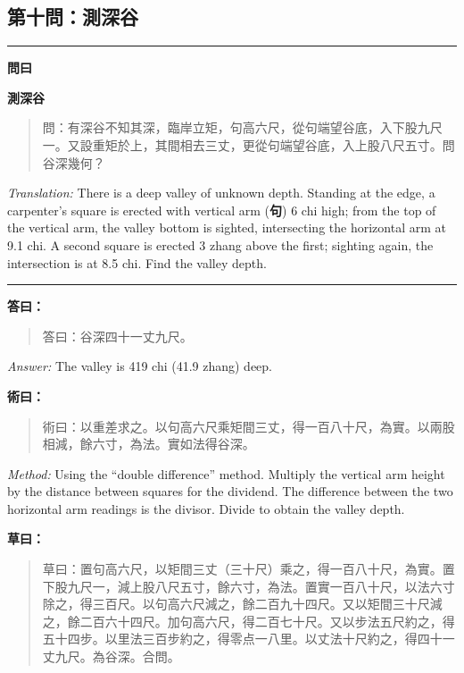 \documentclass[11pt,a4paper]{article}
\newenvironment{problem}[1][]{%
  \medskip\noindent\rule{\textwidth}{0.4pt}%
  \par\noindent\textbf{\color{sectioncolor}#1}\par\nopagebreak%
  \smallskip%
}{%
  \par\noindent\rule{\textwidth}{0.4pt}\medskip%
}
\newenvironment{answer}{%
  \medskip\noindent{\color{answercolor}\rule{0.5\textwidth}{0.5pt}}%
  \par\color{answercolor}%
}{%
  \par\medskip%
}
\newenvironment{method}{%
  \medskip\noindent{\color{methodcolor}\rule{0.5\textwidth}{0.5pt}}%
  \par\color{methodcolor}%
}{%
  \par\medskip%
}
\begin{document}
\subsection*{第十問：測深谷}

\begin{problem}[\textbf{問曰}]
\textbf{\color{sectioncolor}測深谷}

\begin{quote}
\textcolor{chinacolor}{%
問：有深谷不知其深，臨岸立矩，句高六尺，從句端望谷底，入下股九尺一。又設重矩於上，其間相去三丈，更從句端望谷底，入上股八尺五寸。問谷深幾何？
}
\end{quote}

\textit{Translation:} There is a deep valley of unknown depth. Standing 
at the edge, a carpenter's square is erected with vertical arm (\textbf{句}) 
6 chi high; from the top of the vertical arm, the valley bottom is 
sighted, intersecting the horizontal arm at 9.1 chi. A second square 
is erected 3 zhang above the first; sighting again, the intersection is 
at 8.5 chi. Find the valley depth.
\end{problem}

\begin{answer}
\textbf{答曰：}

\begin{quote}
\textcolor{chinacolor}{%
答曰：谷深四十一丈九尺。
}
\end{quote}

\textit{Answer:} The valley is 419 chi (41.9 zhang) deep.
\end{answer}

\begin{method}
\textbf{術曰：}

\begin{quote}
\textcolor{chinacolor}{%
術曰：以重差求之。以句高六尺乘矩間三丈，得一百八十尺，為實。以兩股相減，餘六寸，為法。實如法得谷深。
}
\end{quote}

\textit{Method:} Using the ``double difference'' method. Multiply the 
vertical arm height by the distance between squares for the dividend. 
The difference between the two horizontal arm readings is the divisor. 
Divide to obtain the valley depth.
\end{method}

\noindent\textbf{草曰：}
\begin{quote}
\textcolor{chinacolor}{%
草曰：置句高六尺，以矩間三丈（三十尺）乘之，得一百八十尺，為實。置下股九尺一，減上股八尺五寸，餘六寸，為法。置實一百八十尺，以法六寸除之，得三百尺。以句高六尺減之，餘二百九十四尺。又以矩間三十尺減之，餘二百六十四尺。加句高六尺，得二百七十尺。又以步法五尺約之，得五十四步。以里法三百步約之，得零点一八里。以丈法十尺約之，得四十一丈九尺。為谷深。合問。
}
\end{quote}
\end{document}
